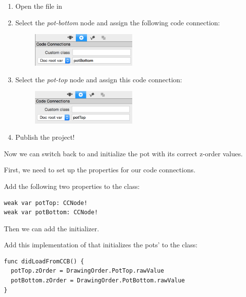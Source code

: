 \begin{leftbar}
\begin{enumerate}
  \item Open the  file in \SB{}
  \item Select the \textit{pot-bottom} node and assign the following code
  connection:
  \begin{figure}[H]
    \centering
    \includegraphics[width=150pt]{images/Chapter6/pot_bottom_code.png}
  \end{figure}
    
  \item Select the \textit{pot-top} node and assign this code connection:
    \begin{figure}[H]
    \centering
    \includegraphics[width=150pt]{images/Chapter6/pot_top_code.png}
  \end{figure}
  
  \item Publish the \SB{} project!
\end{enumerate}
\end{leftbar}

Now we can switch back to \xcode{} and initialize the pot with its correct
z-order values.

First, we need to set up the properties for our code connections.
\begin{leftbar}
Add the following two properties to the  class:
\begin{lstlisting}
weak var potTop: CCNode!
weak var potBottom: CCNode!
\end{lstlisting}
\end{leftbar}

Then we can add the initializer.

\begin{leftbar}
Add this implementation of  that initializes the
pots'  to the  class:
\begin{lstlisting}
func didLoadFromCCB() {
  potTop.zOrder = DrawingOrder.PotTop.rawValue
  potBottom.zOrder = DrawingOrder.PotBottom.rawValue
}
\end{lstlisting}
\end{leftbar}

